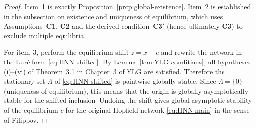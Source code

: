 \documentclass[journal]{IEEEtran}
\newtheorem{assumption}{Assumption}
\newtheorem{proof}{Proof}
\begin{document}
\begin{proof}
Item~1 is exactly Proposition~\ref{prop:global-existence}.  Item~2 is
established in the subsection on existence and uniqueness of
equilibrium, which uses Assumptions~\textbf{C1}, \textbf{C2} and the
derived condition~\textbf{C3$'$} (hence ultimately \textbf{C3}) to
exclude multiple equilibria.

For item~3, perform the equilibrium shift $z=x-e$ and rewrite the
network in the Lur\'e form \eqref{eq:HNN-shifted}.  By
Lemma~\ref{lem:YLG-conditions}, all hypotheses (i)–(vi) of
Theorem~3.1 in Chapter~3 of YLG are satisfied.  Therefore the
stationary set $\Lambda$ of \eqref{eq:HNN-shifted} is pointwise
globally stable.  Since $\Lambda=\{0\}$ (uniqueness of equilibrium),
this means that the origin is globally asymptotically stable for the
shifted inclusion.  Undoing the shift gives global asymptotic
stability of the equilibrium $e$ for the original Hopfield network
\eqref{eq:HNN-main} in the sense of Filippov.
\end{proof}




\end{document}
